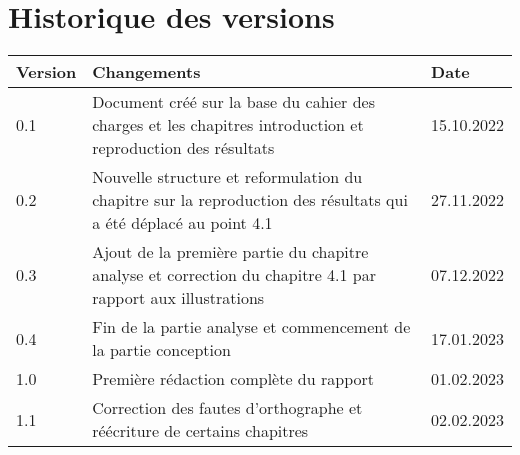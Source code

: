 \chapter{Historique des versions}
\label{chap:versions}

\begin{tabular}{|m{}|m{}|m{}|} 
 \hline
 \textbf{Version} & \textbf{Changements} & \textbf{Date} \\ [0.5ex] 
 \hline
 0.1 & Document créé sur la base du cahier des charges et les chapitres introduction et reproduction des résultats & 15.10.2022  \\ 
 \hline
 0.2 & Nouvelle structure et reformulation du chapitre sur la reproduction des résultats qui a été déplacé au point 4.1 & 27.11.2022  \\ 
 \hline
 0.3 & Ajout de la première partie du chapitre analyse et correction du chapitre 4.1 par rapport aux illustrations & 07.12.2022  \\ 
 \hline
 0.4 & Fin de la partie analyse et commencement de la partie conception & 17.01.2023  \\ 
 \hline
 1.0 & Première rédaction complète du rapport & 01.02.2023  \\ 
 \hline
 1.1 & Correction des fautes d'orthographe et réécriture de certains chapitres & 02.02.2023  \\ 
 \hline
\end{tabular}